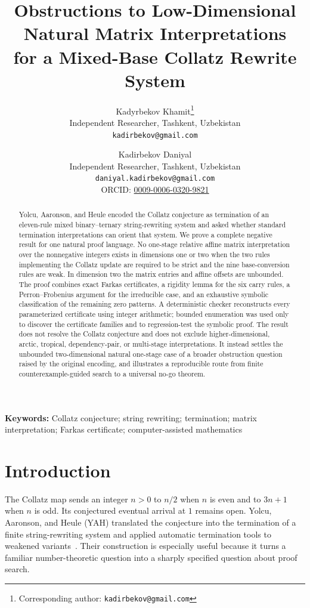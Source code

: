 \documentclass[11pt]{article}
\title{Obstructions to Low-Dimensional Natural Matrix Interpretations\\
for a Mixed-Base Collatz Rewrite System}
\author{
Kadyrbekov Khamit\thanks{Corresponding author: \texttt{kadirbekov@gmail.com}}\\
\small Independent Researcher, Tashkent, Uzbekistan\\
\small \texttt{kadirbekov@gmail.com}
\and
Kadirbekov Daniyal\\
\small Independent Researcher, Tashkent, Uzbekistan\\
\small \texttt{daniyal.kadirbekov@gmail.com}\\
\small ORCID: \href{https://orcid.org/0009-0006-0320-9821}{0009-0006-0320-9821}}
\date{}
\theoremstyle{definition}
\begin{document}
\maketitle

\begin{abstract}
Yolcu, Aaronson, and Heule encoded the Collatz conjecture as termination of
an eleven-rule mixed binary--ternary string-rewriting system and asked
whether standard termination interpretations can orient that system.  We
prove a complete negative result for one natural proof language.  No
one-stage relative affine matrix interpretation over the nonnegative
integers exists in dimensions one or two when the two rules implementing
the Collatz update are required to be strict and the nine base-conversion
rules are weak.  In dimension two the matrix entries and affine offsets are
unbounded.  The proof combines exact Farkas certificates, a rigidity lemma
for the six carry rules, a Perron--Frobenius argument for the irreducible
case, and an exhaustive symbolic classification of the remaining zero
patterns.  A deterministic checker reconstructs every parameterized
certificate using integer arithmetic; bounded enumeration was used only to
discover the certificate families and to regression-test the symbolic
proof.  The result does not resolve the Collatz conjecture and does not
exclude higher-dimensional, arctic, tropical, dependency-pair, or
multi-stage interpretations.  It instead settles the unbounded
two-dimensional natural one-stage case of a broader obstruction question
raised by the original encoding, and illustrates a reproducible route from
finite counterexample-guided search to a universal no-go theorem.
\end{abstract}

\noindent\textbf{Keywords:} Collatz conjecture; string rewriting;
termination; matrix interpretation; Farkas certificate; computer-assisted
mathematics

\section{Introduction}

The Collatz map sends an integer $n>0$ to $n/2$ when $n$ is even and to
$3n+1$ when $n$ is odd.  Its conjectured eventual arrival at $1$ remains
open.  Yolcu, Aaronson, and Heule (YAH) translated the conjecture into the
termination of a finite string-rewriting system and applied automatic
termination tools to weakened variants~\cite{yah}.  Their construction is
especially useful because it turns a familiar number-theoretic question
into a sharply specified question about proof search.
\end{document}
